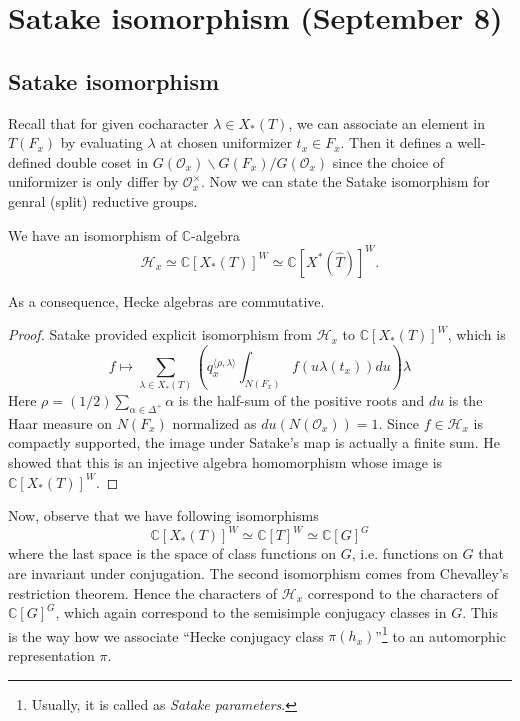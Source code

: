 \newpage
\section{Satake isomorphism (September 8)}



\subsection{Satake isomorphism}
Recall that for given cocharacter $\lambda \in X_{*}(T)$, we can associate an element in $T(F_x)$ 
by evaluating $\lambda$ at chosen uniformizer $t_x \in F_x$.
Then it defines a well-defined double coset in $G(\mathcal{O}_x) \backslash G(F_x) / G(\mathcal{O}_x)$
since the choice of uniformizer is only differ by $\mathcal{O}_x^{\times}$.
Now we can state the Satake isomorphism for genral (split) reductive groups.
\begin{theorem}
We have an isomorphism of $\mathbb{C}$-algebra
$$
\mathcal{H}_{x} \simeq \mathbb{C}[X_{*}(T)]^{W} \simeq \mathbb{C}[X^{*}(\widehat{T})]^{W}.
$$
\end{theorem}
As a consequence, Hecke algebras are commutative.
\begin{proof}
Satake provided explicit isomorphism from $\mathcal{H}_{x}$ to $\mathbb{C}[X_{*}(T)]^{W}$, which is
$$
f \mapsto \sum_{\lambda \in X_{*}(T)} \left(q_{x}^{\langle \rho, \lambda\rangle} \int_{N(F_x)}f(u \lambda(t_x))du \right) \lambda
$$
Here $\rho = (1/2)\sum_{\alpha \in \Delta^{+}}\alpha$ is the half-sum of the positive roots
and $du$ is the Haar measure on $N(F_x)$ normalized as $du(N(\mathcal{O}_x)) = 1$.
Since $f \in \mathcal{H}_x$ is compactly supported, the image under Satake's map is actually a finite sum.
He showed that this is an injective algebra homomorphism whose image is $\mathbb{C}[X_*(T)]^W$.
\end{proof}
Now, observe that we have following isomorphisms
$$
\mathbb{C}[X_{*}(T)]^{W} \simeq \mathbb{C}[T]^{W} \simeq \mathbb{C}[G]^{G}
$$
where the last space is the space of class functions on $G$, i.e. functions on $G$ that are invariant under conjugation.
The second isomorphism comes from Chevalley's restriction theorem.
Hence the characters of $\mathcal{H}_x$ correspond to the characters of $\mathbb{C}[G]^{G}$, which again correspond to
the semisimple conjugacy classes in $G$.
This is the way how we associate ``Hecke conjugacy class $\pi(h_x)$''\footnote{Usually, it is called as \emph{Satake parameters}.} to an automorphic representation $\pi$.


